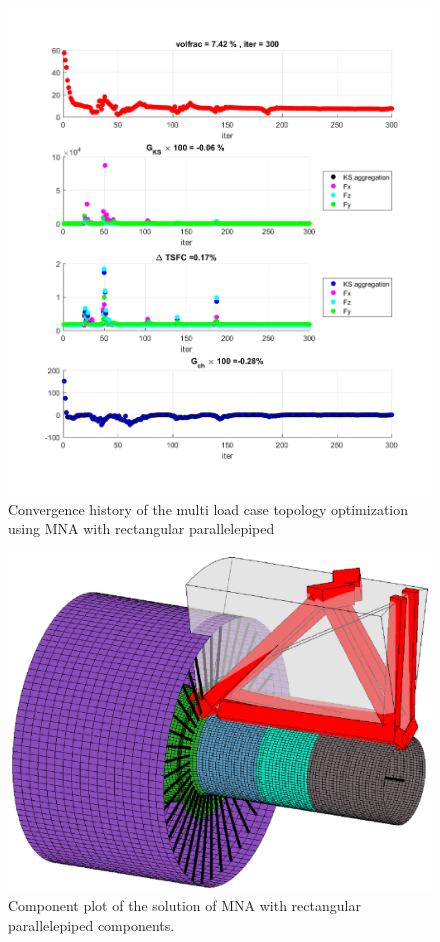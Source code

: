   \begin{figure}[ht]
    \centering
    \includegraphics[width=\textwidth]{images/Ch3/MNA3D_convergence_300}
    \caption{Convergence history of the multi load case topology optimization using MNA with rectangular parallelepiped}
    \label{fig.3.36}
    \end{figure}
     \begin{figure}[ht]
      \centering
      \includegraphics[width=\textwidth]{images/Ch3/MNA3D_component_plot}
      \caption{Component plot of the solution of MNA with rectangular parallelepiped components.}
      \label{fig.3.37}
      \end{figure}
